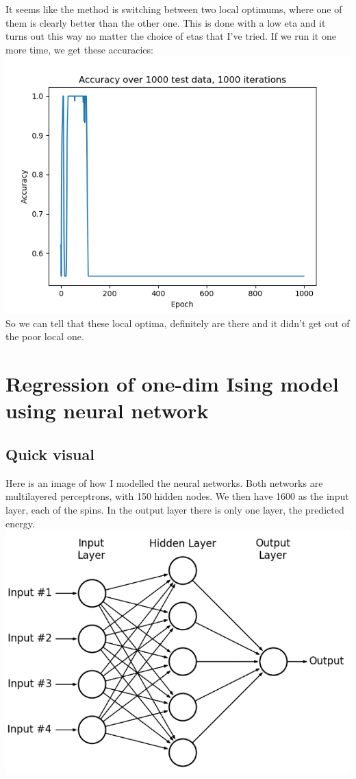 \documentclass[a4paper,norsk]{article}
\begin{document}
It seems like the method is switching between two local optimums, where one of them is clearly better than the other one. This is done with a low eta and it turns out this way no matter the choice of etas that I've tried. If we run it one more time, we get these accuracies:\\
\includegraphics[scale=.7]{images/logplots/1000iter2}\\
So we can tell that these local optima, definitely are there and it didn't get out of the poor local one.




\clearpage
\section{Regression of one-dim Ising model using neural network}
\subsection{Quick visual}
Here is an image of how I modelled the neural networks. Both networks are multilayered perceptrons, with 150 hidden nodes. We then have 1600 as the input layer, each of the spins. In the output layer there is only one layer, the predicted energy.\\
\includegraphics[scale=.4]{images/mlplayout}\\
\end{document}
